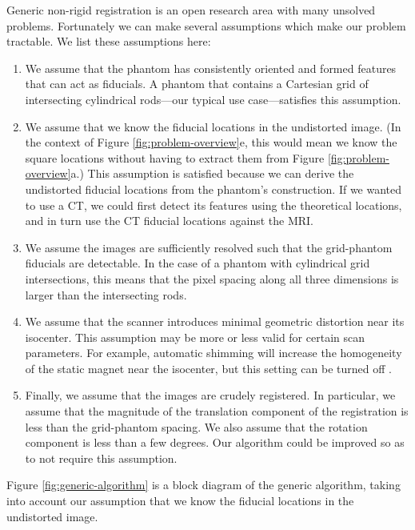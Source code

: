 \documentclass[12pt]{article}
\begin{document}
Generic non-rigid registration is an open research area with many unsolved problems.  Fortunately we can make several assumptions which make our problem tractable.  We list these assumptions here:

\begin{enumerate}
\item We assume that the phantom has consistently oriented and formed features that can act as fiducials.  A phantom that contains a Cartesian grid of intersecting cylindrical rods---our typical use case---satisfies this assumption.

\item We assume that we know the fiducial locations in the undistorted image.  (In the context of Figure \ref{fig:problem-overview}e, this would mean we know the square locations without having to extract them from Figure \ref{fig:problem-overview}a.)  This assumption is satisfied because we can derive the undistorted fiducial locations from the phantom's construction.  If we wanted to use a CT, we could first detect its features using the theoretical locations, and in turn use the CT fiducial locations against the MRI.

\item We assume the images are sufficiently resolved such that the grid-phantom fiducials are detectable.  In the case of a phantom with cylindrical grid intersections, this means that the pixel spacing along all three dimensions is larger than the intersecting rods.

\item We assume that the scanner introduces minimal geometric distortion near its isocenter.  This assumption may be more or less valid for certain scan parameters.  For example, automatic shimming will increase the homogeneity of the static magnet near the isocenter, but this setting can be turned off \cite{baldwin2007}.

\item Finally, we assume that the images are crudely registered.  In particular, we assume that the magnitude of the translation component of the registration is less than the grid-phantom spacing.  We also assume that the rotation component is less than a few degrees.  Our algorithm could be improved so as to not require this assumption.
\end{enumerate}

Figure \ref{fig:generic-algorithm} is a block diagram of the generic algorithm, taking into account our assumption that we know the fiducial locations in the undistorted image.
\end{document}
